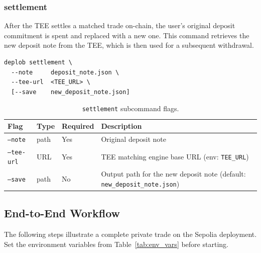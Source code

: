 \documentclass[12pt,a4paper]{article}
\begin{document}
\subsubsection{settlement}

After the TEE settles a matched trade on-chain, the user's original deposit commitment is spent and replaced with a new one.  This command retrieves the new deposit note from the TEE, which is then used for a subsequent withdrawal.

\begin{verbatim}
deplob settlement \
  --note     deposit_note.json \
  --tee-url  <TEE_URL> \
  [--save    new_deposit_note.json]
\end{verbatim}

\begin{table}[H]
\centering
\small
\begin{tabular}{|l|l|l|p{5cm}|}
\hline
\textbf{Flag} & \textbf{Type} & \textbf{Required} & \textbf{Description} \\
\hline
\texttt{--note} & path & Yes & Original deposit note \\
\hline
\texttt{--tee-url} & URL & Yes & TEE matching engine base URL (env: \texttt{TEE\_URL}) \\
\hline
\texttt{--save} & path & No & Output path for the new deposit note (default: \texttt{new\_deposit\_note.json}) \\
\hline
\end{tabular}
\caption{\texttt{settlement} subcommand flags.}
\end{table}

\subsection{End-to-End Workflow}

The following steps illustrate a complete private trade on the Sepolia deployment.  Set the environment variables from Table~\ref{tab:env_vars} before starting.
\end{document}
